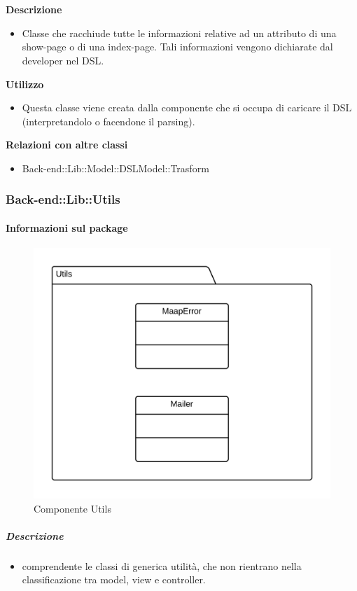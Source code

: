 				\textbf{\\ \\ Descrizione} 
					\begin{itemize}
						\item[] Classe che racchiude tutte le informazioni relative ad un attributo di una show-page o di una index-page. Tali informazioni vengono dichiarate dal developer nel DSL.
					\end{itemize}      
				\textbf{Utilizzo}  
					\begin{itemize}
						\item[] Questa classe viene creata dalla componente che si occupa di caricare il DSL (interpretandolo o facendone il parsing).
					\end{itemize}
					\textbf{Relazioni con altre classi}
					\begin{itemize}
							\item{Back-end::Lib::Model::DSLModel::Trasform}
					\end{itemize}
	\subsubsection{Back-end::Lib::Utils}
	\paragraph{Informazioni sul package} 
		\begin{figure}[H] 
			\begin{center} 
				\includegraphics[scale=0.17]{uml/package/Back-end::Lib::Utils.png}  
				\caption{Componente Utils}
			\end{center}  
		\end{figure} 
	\subparagraph{Descrizione} 
		\begin{itemize}
		\item[]  comprendente le classi di generica utilità, che non rientrano nella classificazione tra model, view e controller.
		\end{itemize} 
